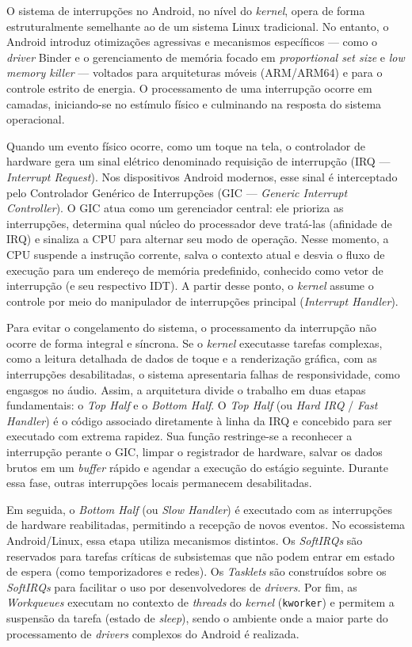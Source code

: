 \documentclass[12pt,a4paper]{article}
\begin{document}
O sistema de interrupções no Android, no nível do \emph{kernel}, opera de forma
estruturalmente semelhante ao de um sistema Linux tradicional. No entanto, o
Android introduz otimizações agressivas e mecanismos específicos --- como o
\emph{driver} Binder e o gerenciamento de memória focado em \emph{proportional
set size} e \emph{low memory killer} --- voltados para arquiteturas móveis
(ARM/ARM64) e para o controle estrito de energia. O processamento de uma
interrupção ocorre em camadas, iniciando-se no estímulo físico e culminando na
resposta do sistema operacional.

Quando um evento físico ocorre, como um toque na tela, o controlador de hardware
gera um sinal elétrico denominado requisição de interrupção (IRQ ---
\emph{Interrupt Request}). Nos dispositivos Android modernos, esse sinal é
interceptado pelo Controlador Genérico de Interrupções (GIC --- \emph{Generic
Interrupt Controller}). O GIC atua como um gerenciador central: ele prioriza as
interrupções, determina qual núcleo do processador deve tratá-las (afinidade de
IRQ) e sinaliza a CPU para alternar seu modo de operação. Nesse momento, a CPU
suspende a instrução corrente, salva o contexto atual e desvia o fluxo de
execução para um endereço de memória predefinido, conhecido como vetor de
interrupção (e seu respectivo IDT). A partir desse ponto, o \emph{kernel} assume
o controle por meio do manipulador de interrupções principal (\emph{Interrupt
Handler}).

Para evitar o congelamento do sistema, o processamento da interrupção não ocorre
de forma integral e síncrona. Se o \emph{kernel} executasse tarefas complexas,
como a leitura detalhada de dados de toque e a renderização gráfica, com as
interrupções desabilitadas, o sistema apresentaria falhas de responsividade,
como engasgos no áudio. Assim, a arquitetura divide o trabalho em duas etapas
fundamentais: o \emph{Top Half} e o \emph{Bottom Half}. O \emph{Top Half} (ou
\emph{Hard IRQ} / \emph{Fast Handler}) é o código associado diretamente à linha
da IRQ e concebido para ser executado com extrema rapidez. Sua função
restringe-se a reconhecer a interrupção perante o GIC, limpar o registrador de
hardware, salvar os dados brutos em um \emph{buffer} rápido e agendar a execução
do estágio seguinte. Durante essa fase, outras interrupções locais permanecem
desabilitadas.

Em seguida, o \emph{Bottom Half} (ou \emph{Slow Handler}) é executado com as
interrupções de hardware reabilitadas, permitindo a recepção de novos eventos.
No ecossistema Android/Linux, essa etapa utiliza mecanismos distintos. Os
\emph{SoftIRQs} são reservados para tarefas críticas de subsistemas que não
podem entrar em estado de espera (como temporizadores e redes). Os
\emph{Tasklets} são construídos sobre os \emph{SoftIRQs} para facilitar o uso
por desenvolvedores de \emph{drivers}. Por fim, as \emph{Workqueues} executam no
contexto de \emph{threads} do \emph{kernel} (\texttt{kworker}) e permitem a
suspensão da tarefa (estado de \emph{sleep}), sendo o ambiente onde a maior
parte do processamento de \emph{drivers} complexos do Android é realizada.
\end{document}
